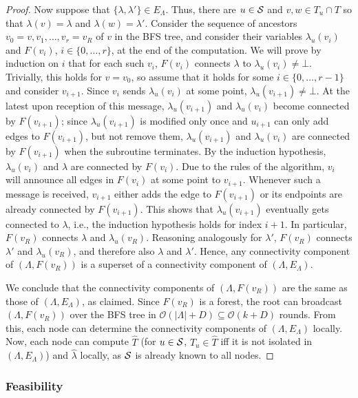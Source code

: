 \documentclass[letterpaper,11pt]{article}
\newcommand{\BO}{\mathcal{O}}
\newcommand{\Comp}{\lambda}
\begin{document}
\begin{proof}
Now suppose that $\{\Comp,\Comp'\}\in E_{\Lambda}$. Thus, there are $u\in {\cal
S}$ and $v,w\in T_u\cap T$ so that $\Comp(v)=\Comp$ and $\Comp(w)=\Comp'$.
Consider the sequence of ancestors $v_0=v, v_1,\ldots,v_r=v_R$ of $v$ in the BFS
tree, and consider their variables $\Comp_u(v_i)$ and $F(v_i)$, $i\in
\{0,\ldots,r\}$, at the end of the computation. We will prove by induction on
$i$ that for each such $v_i$, $F(v_i)$ connects $\Comp$ to $\Comp_u(v_i)\neq
\bot$. Trivially, this holds for $v=v_0$, so assume that it holds for some $i\in
\{0,\ldots,r-1\}$ and consider $v_{i+1}$. Since $v_i$ sends $\Comp_u(v_i)$ at
some point, $\Comp_u(v_{i+1})\neq \bot$. At the latest upon reception of this
message, $\Comp_u(v_{i+1})$ and $\Comp_u(v_i)$ become connected by $F(v_{i+1})$;
since $\Comp_u(v_{i+1})$ is modified only once and $u_{i+1}$ can only add edges
to $F(v_{i+1})$, but not remove them, $\Comp_u(v_{i+1})$ and $\Comp_u(v_i)$ are
connected by $F(v_{i+1})$ when the subroutine terminates. By the induction
hypothesis, $\Comp_u(v_i)$ and $\Comp$ are connected by $F(v_i)$. Due to the
rules of the algorithm, $v_i$ will announce all edges in $F(v_i)$ at
some point to $v_{i+1}$. Whenever such a message is received, $v_{i+1}$ either
adds the edge to $F(v_{i+1})$ or its endpoints are already connected by
$F(v_{i+1})$. This shows that $\Comp_u(v_{i+1})$ eventually gets connected to
$\Comp$, i.e., the induction hypothesis holds for index $i+1$. In particular,
$F(v_R)$ connects $\Comp$ and $\Comp_u(v_R)$. Reasoning analogously for
$\Comp'$, $F(v_R)$ connects $\Comp'$ and $\Comp_u(v_R)$, and therefore also
$\Comp$ and $\Comp'$. Hence, any connectivity component of $(\Lambda,F(v_R))$ is
a superset of a connectivity component of $(\Lambda,E_{\Lambda})$.

We conclude that the connectivity components of $(\Lambda,F(v_R))$ are the same
as those of $(\Lambda,E_{\Lambda})$, as claimed. Since $F(v_R)$ is a forest, the
root can broadcast $(\Lambda,F(v_R))$ over the BFS tree in
$\BO(|\Lambda|+D)\subseteq\BO(k+D)$ rounds. From this, each node can determine
the connectivity components of $(\Lambda,E_{\Lambda})$ locally. Now, each node
can compute $\hat{T}$ (for $u\in {\cal S}$, $T_u\in \hat{T}$ iff it is not
isolated in $(\Lambda,E_{\Lambda})$) and $\hat{\Comp}$ locally, as ${\cal S}$ is
already known to all nodes.
\end{proof}

\subsubsection*{Feasibility}
\end{document}
